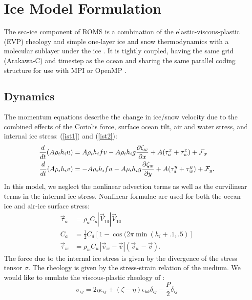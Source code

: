\section{Ice Model Formulation}
\label{Iphys}

The sea-ice component of ROMS is a combination of the
elastic-viscous-plastic (EVP) rheology 
\citep{Hunke97,Hunke_2001} and simple one-layer
ice and snow thermodynamics with a molecular sublayer under the ice
\citep{Mellor89}. It is tightly coupled, having
the same grid (Arakawa-C) and timestep as the ocean and sharing the same
parallel coding structure for use with MPI or OpenMP \citep{Budgell05}.

\subsection{Dynamics}
The momentum equations describe the change in ice/snow velocity due
to the combined effects of the Coriolis force, surface ocean tilt,
air and water stress, and internal ice stress:
(\ref{ist1}) and (\ref{ist2}):
\begin{align}
  \frac{d}{ dt}(A \rho_i h_i u)
 & = A \rho_i h_i fv - A \rho_i h_i g \frac{\partial \zeta_w }{ \partial x} +
 A (\tau_a^x + \tau_w^x) + {\cal F}_x
\label{ist1} \\
  \frac{d}{ d t}(A \rho_i h_i v)
 & = - A \rho_i h_i fu - A \rho_i h_i g \frac{\partial \zeta_w }{ \partial y} +
 A (\tau_a^y + \tau_w^y) + {\cal F}_y.
\label{ist2}
\end{align}
In this model, we neglect the nonlinear advection terms as well as
the curvilinear terms in the internal ice stress.
Nonlinear formulae are used for both the ocean-ice and air-ice surface
stress:
\begin{align}
  \vec{\tau}_a & = \rho_a C_a | \vec{V}_{10} | \vec{V}_{10} \\
  C_a & = \frac{1 }{ 2} C_d \left[ 1 - \cos( 2 \pi \min(h_i+.1, .5)
  \right] \\
  \vec{\tau}_w & = \rho_w C_w | \vec{v}_w - \vec{v} |
  ( \vec{v}_w - \vec{v}) .
\end{align}
The force due to the internal ice stress is given by the divergence of
the stress tensor $\sigma$. The rheology is given by the stress-strain
relation of the medium. We would like to emulate the viscous-plastic
rheology of \citet{Hibler79}:
\begin{equation}
  \sigma_{ij} = 2 \eta \dot \epsilon_{ij} + (\zeta - \eta) \dot
  \epsilon_{kk} \delta_{ij} - \frac{P }{ 2} \delta_{ij}
\end{equation}
